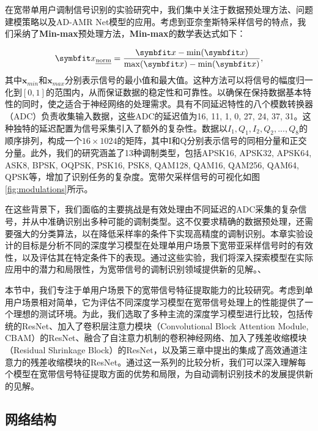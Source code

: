 在宽带单用户调制信号识别的实验研究中，我们集中关注于数据预处理方法、问题建模策略以及AD-AMR Net模型的应用。考虑到亚奈奎斯特采样信号的特点，我们采纳了\textbf{Min-max}预处理方法，\textbf{Min-max}的数学表达式如下：

\begin{equation}
    \boldsymbol{x}_\text{\emph{norm}} = \frac{\boldsymbol{x} - \min(\boldsymbol{x})}{\max(\boldsymbol{x}) - \min(\boldsymbol{x})},
\end{equation}
其中$\boldsymbol{x}_{min}$和$\boldsymbol{x}_{max}$分别表示信号的最小值和最大值。这种方法可以将信号的幅度归一化到$[0, 1]$的范围内，从而保证数据的稳定性和可靠性。以确保在保持数据基本特性的同时，使之适合于神经网络的处理需求。具有不同延迟特性的八个模数转换器（ADC）负责收集输入数据，这些ADC的延迟值为16, 11, 1, 0, 27, 24, 37, 31。这种独特的延迟配置为信号采集引入了额外的复杂性。数据以$I_1, Q_1, I_2, Q_2, ..., Q_8$的顺序排列，构成一个$16 \times 1024$的矩阵，其中I和Q分别表示信号的同相分量和正交分量。此外，我们的研究涵盖了13种调制类型，包括APSK16, APSK32, APSK64, ASK8, BPSK, OQPSK, PSK16, PSK8, QAM128, QAM16, QAM256, QAM64, QPSK等，增加了识别任务的复杂度。宽带欠采样信号的可视化如图\ref{fig:modulations}所示。

在这些背景下，我们面临的主要挑战是有效处理由不同延迟的ADC采集的复杂信号，并从中准确识别出多种可能的调制类型。这不仅要求精确的数据预处理，还需要强大的分类算法，以在降低采样率的条件下实现高精度的调制识别。本章实验设计的目标是分析不同的深度学习模型在处理单用户场景下宽带亚采样信号时的有效性，以及评估其在特定条件下的表现。通过这些实验，我们将深入探索模型在实际应用中的潜力和局限性，为宽带信号的调制识别领域提供新的见解。、

本节中，我们专注于单用户场景下的宽带信号特征提取能力的比较研究。考虑到单用户场景相对简单，它为评估不同深度学习模型在宽带信号处理上的性能提供了一个理想的测试环境。为此，我们选取了多种主流的深度学习模型进行比较，包括传统的ResNet、加入了卷积层注意力模块（Convolutional Block Attention Module, CBAM）的ResNet、融合了自注意力机制的卷积神经网络、加入了残差收缩模块（Residual Shrinkage Block）的ResNet，以及第三章中提出的集成了高效通道注意力的残差收缩模块的ResNet。通过这一系列的比较分析，我们可以深入理解每个模型在宽带信号特征提取方面的优势和局限，为自动调制识别技术的发展提供新的见解。

\subsection{网络结构}\label{sec:background}


